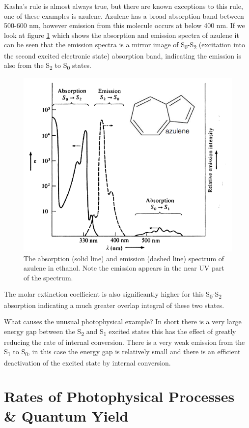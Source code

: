 \documentclass[
]{book}
\begin{document}
Kasha's rule is almost always true, but there are known exceptions to this rule, one of these examples is azulene. Azulene has a broad absorption band between 500-600 nm, however emission from this molecule occurs at below 400 nm. If we look at figure \ref{fig:azulene} which shows the absorption and emission spectra of azulene it can be seen that the emission spectra is a mirror image of S\textsubscript{0}-S\textsubscript{2} (excitation into the second excited electronic state) absorption band, indicating the emission is also from the S\textsubscript{2} to S\textsubscript{0} states.

\begin{figure}

{\centering \includegraphics[width=0.6\linewidth]{images/azulene} 

}

\caption{The absorption (solid line) and emission (dashed line) spectrum of azulene in ethanol. Note the emission appears in the near UV part of the spectrum. }\label{fig:azulene}
\end{figure}

The molar extinction coefficient is also significantly higher for this S\textsubscript{0}-S\textsubscript{2} absorption indicating a much greater overlap integral of these two states.

What causes the unusual photophysical example? In short there is a very large energy gap between the S\textsubscript{2} and S\textsubscript{1} excited states this has the effect of greatly reducing the rate of internal conversion. There is a very weak emission from the S\textsubscript{1} to S\textsubscript{0}, in this case the energy gap is relatively small and there is an efficient deactivation of the excited state by internal conversion.

\hypertarget{sec:ratesphoto}{%
\section{Rates of Photophysical Processes \& Quantum Yield}\label{sec:ratesphoto}}
\end{document}
